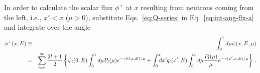 
%
In order to calculate the scalar flux $\phi^+$ at $x$ resulting from neutrons coming from the left, i.e., $x'<x$ ($\mu>0$), substitute Eqs.~\eqref{eq:Q-series} in Eq.~\eqref{eq:int-ang-flx-a} and integrate over the angle 
\begin{eqnarray}\label{eq:phi+}
\phi^+(x,E)&\equiv& \int_0^1 {d\mu \psi(x,E,\mu)} \nonumber \\
&=& \sum\limits_{l=0}^\infty {
	\frac{2l+1}{2} 
		\left\{\psi_l(0,E) \int_0^1 { d\mu
		\ensuremath{P_l(\mu)} e^{-\tau(0,x,E)/\mu}	
	}
	+	\int_0^x {\!\!\! dx'
		q_l(x',E)
		\int_0^1 { d\mu
			\frac{\ensuremath{P_l(\mu)}}{\mu} e^{-\tau(x',x,E)/\mu}	
		}
	}
\right\}
} \,\, .
\end{eqnarray}

